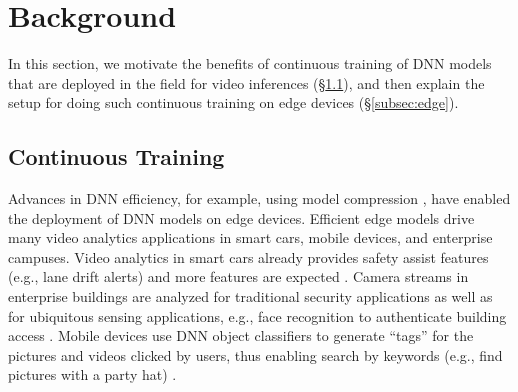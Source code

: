 
\section{Background}
\label{sec:background}

In this section, we motivate the benefits of continuous training of DNN models that are deployed in the field for video inferences (\S\ref{subsec:continuous}), and then explain the setup for doing such continuous training on edge devices (\S\ref{subsec:edge}).

\subsection{Continuous Training}
\label{subsec:continuous}

Advances in DNN efficiency, for example, using model compression \cite{compression1, compression2}, have enabled the deployment of DNN models on edge devices. Efficient edge models drive many video analytics applications in smart cars, mobile devices, and enterprise campuses. Video analytics in smart cars already provides safety assist features (e.g., lane drift alerts) and more features are expected \cite{smart-cars}. Camera streams in enterprise buildings are analyzed for traditional security applications as well as for ubiquitous sensing applications, e.g., face recognition to authenticate building access \cite{smart-buildings}. Mobile devices use DNN object classifiers to generate ``tags'' for the pictures and videos clicked by users, thus enabling search by keywords (e.g., find pictures with a party hat) \cite{iphone-indexing}. 

